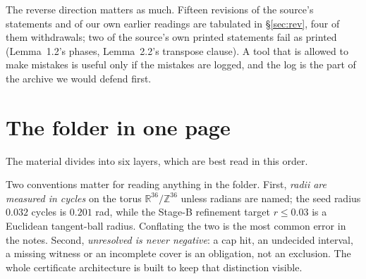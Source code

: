 \documentclass[10pt]{article}
\theoremstyle{definition}
\newcommand{\R}{\mathbb{R}}
\newcommand{\Z}{\mathbb{Z}}
\begin{document}
The reverse direction matters as much. Fifteen revisions of the source's statements and of our own earlier
readings are tabulated in \S\ref{sec:rev}, four of them withdrawals; two of the source's own
printed statements fail as printed (Lemma~1.2's phases, Lemma~2.2's transpose clause). A tool that is
allowed to make mistakes is useful only if the mistakes are logged, and the log is the part of the
archive we would defend first.

\section{The folder in one page}\label{sec:folder}

The material divides into six layers, which are best read in this order.



Two conventions matter for reading anything in the folder. First, \emph{radii are measured in cycles}
on the torus $\R^{36}/\Z^{36}$ unless radians are named; the seed radius $0.032$ cycles is $0.201$ rad,
while the Stage-B refinement target $r\le0.03$ is a Euclidean tangent-ball radius. Conflating the two
is the most common error in the notes. Second, \emph{unresolved is never negative}: a cap hit, an
undecided interval, a missing witness or an incomplete cover is an obligation, not an exclusion. The
whole certificate architecture is built to keep that distinction visible.
\end{document}
